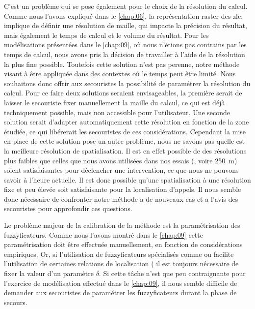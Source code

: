 C'est un problème qui se pose également pour le choix de la résolution
du calcul. Comme nous l'avons expliqué dans le \autoref{chap:06}, la
représentation raster des \ac{zlc}, implique de définir une résolution
de maille, qui impacte la précision du résultat, mais également le
temps de calcul et le volume du résultat. Pour les modélisations
présentées dans le \autoref{chap:09}, où nous n'étions pas contrains
par les temps de calcul, nous avons pris la décision de travailler à
l'aide de la résolution la plus fine possible. Toutefois cette
solution n'est pas perenne, notre méthode visant à être appliquée dans
des contextes où le temps peut être limité. Nous souhaitons donc
offrir aux secouristes la possibilité de paramétrer la résolution du
calcul. Pour ce faire deux solutions seraient envisageables, la
première serait de laisser le secouriste fixer manuellement la maille
du calcul, ce qui est déjà techniquement possible, mais non accessible
pour l'utilisateur. Une seconde solution serait d'adapter
automatiquement cette résolution en fonction de la zone étudiée, ce
qui libérerait les secouristes de ces considérations. Cependant la
mise en place de cette solution pose un autre problème, nous ne savons
pas quelle est la meilleure résolution de spatialisation. Il est en
effet possible de des résolutions plus faibles que celles que nous
avons utilisées dans nos essais (, voire 250~m) soient
satisfaisantes pour déclencher une intervention, ce que nous ne
pouvons savoir à l'heure actuelle. Il est donc possible qu'une
spatialisation à une résolution fixe et peu élevée soit satisfaisante
pour la localisation d'appels. Il nous semble donc nécessaire de
confronter notre méthode a de nouveaux cas et a l'avis des secouristes
pour approfondir ces questions.

Le problème majeur de la calibration de la méthode est la
paramétrisation des fuzzyficateurs. Comme nous l'avons montré dans le
\autoref{chap:09} cette paramétrisation doit être effectuée
manuellement, en fonction de considérations empiriques. Or, si
l'utilisation de fuzzyficateurs spécialisés comme
 ou  facilite
l'utilisation de certaines relations de localisation (\eg
{} il est toujours nécessaire de fixer la valeur
d'un paramètre \(\delta\). Si cette tâche n'est que peu contraignante
pour l'exercice de modélisation effectué dans le \autoref{chap:09}, il
nous semble difficile de demander aux secouristes de paramétrer les
fuzzyficateurs durant la phase de secours.


